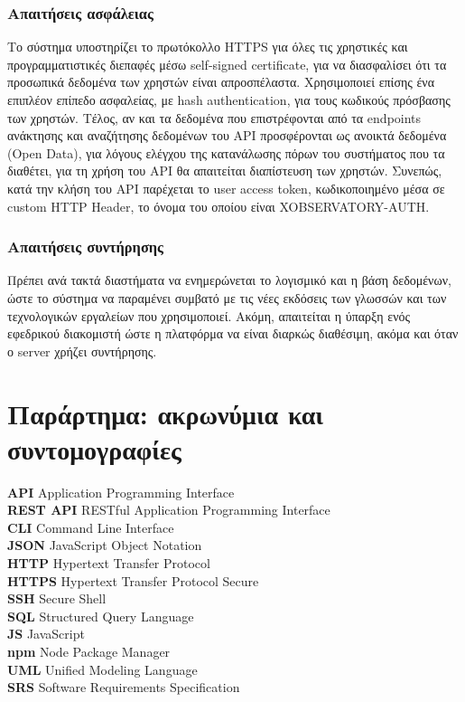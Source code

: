 \documentclass[a4paper,12pt, oneside]{article}
\begin{document}
\subsubsection{Απαιτήσεις ασφάλειας}
Το σύστημα υποστηρίζει το πρωτόκολλο \textlatin{HTTPS} για όλες τις χρηστικές και προγραμματιστικές διεπαφές μέσω \textlatin{self-signed certificate}, για να διασφαλίσει ότι τα προσωπικά δεδομένα των χρηστών είναι απροσπέλαστα. Χρησιμοποιεί επίσης ένα επιπλέον επίπεδο ασφαλείας,  με \textlatin{hash authentication}, για τους κωδικούς πρόσβασης των χρηστών. Τέλος, αν και τα δεδομένα που επιστρέφονται από τα \textlatin{endpoints} ανάκτησης και αναζήτησης δεδομένων του \textlatin{API}  προσφέρονται ως ανοικτά δεδομένα \textlatin{(Open Data)}, για λόγους ελέγχου της κατανάλωσης πόρων του συστήματος που τα διαθέτει, για τη χρήση του \textlatin{API} θα απαιτείται διαπίστευση των χρηστών. Συνεπώς, κατά την κλήση του \textlatin{API} παρέχεται το \textlatin{user access token}, κωδικοποιημένο μέσα σε \textlatin{custom HTTP Header}, το όνομα του οποίου είναι \textlatin{XOBSERVATORY-AUTH.}

\subsubsection{Απαιτήσεις συντήρησης}
Πρέπει ανά τακτά διαστήματα να ενημερώνεται το λογισμικό και η βάση δεδομένων, ώστε το σύστημα να παραμένει συμβατό με τις νέες εκδόσεις των γλωσσών και των τεχνολογικών εργαλείων που χρησιμοποιεί. Ακόμη, απαιτείται η ύπαρξη ενός εφεδρικού διακομιστή ώστε η πλατφόρμα να είναι διαρκώς διαθέσιμη, ακόμα και όταν ο \textlatin{server}  χρήζει συντήρησης.


\newpage
\section{Παράρτημα: ακρωνύμια και συντομογραφίες}
\textlatin{\textbf{API} Application Programming Interface\\
\textbf{REST API} RESTful Application Programming Interface\\
\textbf{CLI} Command Line Interface\\
\textbf{JSON} JavaScript Object Notation\\
\textbf{HTTP} Hypertext Transfer Protocol\\
\textbf{HTTPS} Hypertext Transfer Protocol Secure\\
\textbf{SSH} Secure Shell \\
\textbf{SQL}  Structured Query Language\\
\textbf{JS} JavaScript\\
\textbf{npm} Node Package Manager\\
\textbf{UML} Unified Modeling Language\\
\textbf{SRS} Software Requirements Specification 
}
\end{document}

